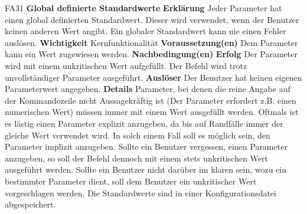 \documentclass[a4paper,12pt]{article}
\begin{document}
\begin{itemize}[nosep]
\begin{minipage}[t]{\linewidth}
\item[FA31] \textbf{Global definierte Standardwerte}
\subitem \textbf{Erklärung} Jeder Parameter hat einen global definierten Standardwert. Dieser wird verwendet, wenn der \gls{Benutzer} keinen anderen Wert angibt. Ein globaler Standardwert kann nie einen Fehler auslösen.
\subitem \textbf{Wichtigkeit} Kernfunktionalität
\subitem \textbf{Voraussetzung(en)} Dem Parameter kann ein Wert zugewiesen werden.
\subitem \textbf{Nachbedingung(en)} 
\subsubitem \textbf{Erfolg} Der Parameter wird mit einem unkritischen Wert aufgefüllt.\newline
Der Befehl wird trotz unvollständiger Parameter ausgeführt.
\subitem \textbf{Auslöser} Der Benutzer hat keinen eigenen Parameterwert angegeben.
\subitem \textbf{Details} Parameter, bei denen die reine Angabe auf der Kommandozeile nicht Aussagekräftig ist (Der Parameter erfordert z.B. einen numerischen Wert) müssen immer mit einem Wert ausgefüllt werden.\newline
Oftmals ist es lästig einen Parameter explizit anzugeben, da bis auf Randfälle immer der gleiche Wert verwendet wird. In solch einem Fall soll es möglich sein, den Parameter implizit anzugeben.\newline
Sollte ein \gls{Benutzer} vergessen, einen Parameter anzugeben, so soll der Befehl dennoch mit einem stets unkritischen Wert ausgeführt werden.\newline
Sollte ein \gls{Benutzer} nicht darüber im klaren sein, wozu ein bestimmter Parameter dient, soll dem \gls{Benutzer} ein unkritischer Wert vorgeschlagen werden.\newline
Die Standardwerte sind in einer Konfigurationsdatei abgespeichert.
\end{minipage}
\pagebreak


\end{itemize}
\end{document}

